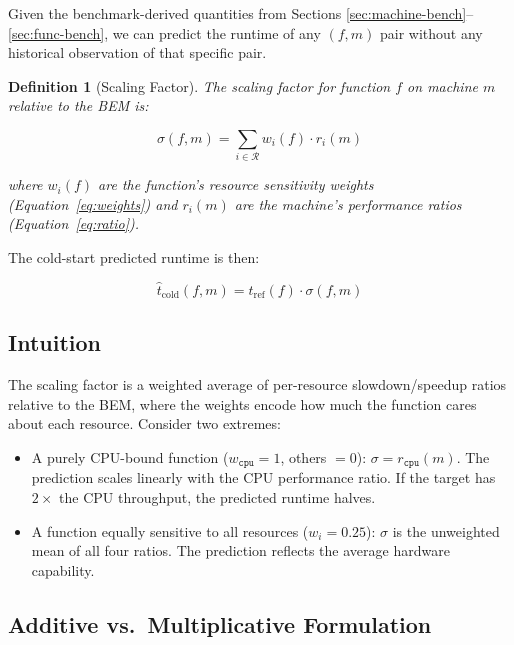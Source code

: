 \documentclass[11pt, a4paper]{article}
\newcommand{\bluecontentbegin}{\begingroup\color{blue!70!black}}
\newtheorem{definition}{Definition}
\begin{document}
Given the benchmark-derived quantities from Sections
\ref{sec:machine-bench}--\ref{sec:func-bench}, we can predict the runtime of
any $(f, m)$ pair without any historical observation of that specific pair.

\begin{definition}[Scaling Factor]
\label{def:scaling}
The scaling factor for function $f$ on machine $m$ relative to the BEM is:

\begin{equation}
\label{eq:scaling}
    \boxed{\;\sigma(f, m) = \sum_{i \in \mathcal{R}} w_i(f) \cdot r_i(m)\;}
\end{equation}

where $w_i(f)$ are the function's resource sensitivity weights
(Equation~\ref{eq:weights}) and $r_i(m)$ are the machine's performance ratios
(Equation~\ref{eq:ratio}).
\end{definition}

The cold-start predicted runtime is then:

\begin{equation}
\label{eq:coldstart}
    \hat{t}_{\mathrm{cold}}(f, m) = t_{\mathrm{ref}}(f) \cdot \sigma(f, m)
\end{equation}

\subsection{Intuition}

The scaling factor is a weighted average of per-resource slowdown/speedup
ratios relative to the BEM, where the weights encode how much the function
cares about each resource. Consider two extremes:

\begin{itemize}
    \item A purely CPU-bound function ($w_{\texttt{cpu}} = 1$, others $= 0$):
          $\sigma = r_{\texttt{cpu}}(m)$. The prediction scales linearly with
          the CPU performance ratio. If the target has $2\times$ the CPU
          throughput, the predicted runtime halves.
    \item A function equally sensitive to all resources ($w_i = 0.25$):
          $\sigma$ is the unweighted mean of all four ratios. The prediction
          reflects the average hardware capability.
\end{itemize}

\subsection{Additive vs.\ Multiplicative Formulation}
\bluecontentbegin
\end{document}
